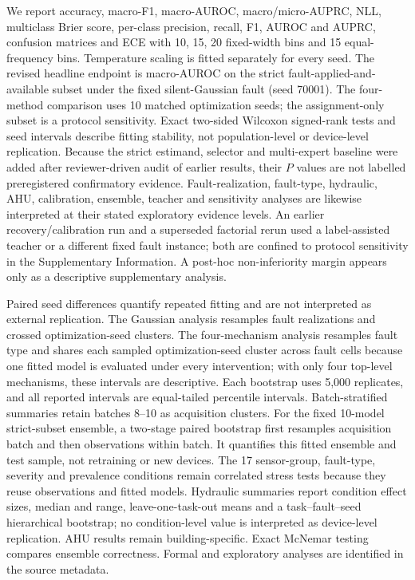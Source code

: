 \documentclass[11pt]{article}
\begin{document}
We report accuracy, macro-F1, macro-AUROC, macro/micro-AUPRC, NLL, multiclass Brier score, per-class precision, recall, F1, AUROC and AUPRC, confusion matrices and ECE with 10, 15, 20 fixed-width bins and 15 equal-frequency bins. Temperature scaling is fitted separately for every seed. The revised headline endpoint is macro-AUROC on the strict fault-applied-and-available subset under the fixed silent-Gaussian fault (seed 70001). The four-method comparison uses 10 matched optimization seeds; the assignment-only subset is a protocol sensitivity. Exact two-sided Wilcoxon signed-rank tests and seed intervals describe fitting stability, not population-level or device-level replication. Because the strict estimand, selector and multi-expert baseline were added after reviewer-driven audit of earlier results, their $P$ values are not labelled preregistered confirmatory evidence. Fault-realization, fault-type, hydraulic, AHU, calibration, ensemble, teacher and sensitivity analyses are likewise interpreted at their stated exploratory evidence levels. An earlier recovery/calibration run and a superseded factorial rerun used a label-assisted teacher or a different fixed fault instance; both are confined to protocol sensitivity in the Supplementary Information. A post-hoc non-inferiority margin appears only as a descriptive supplementary analysis.

Paired seed differences quantify repeated fitting and are not interpreted as external replication. The Gaussian analysis resamples fault realizations and crossed optimization-seed clusters. The four-mechanism analysis resamples fault type and shares each sampled optimization-seed cluster across fault cells because one fitted model is evaluated under every intervention; with only four top-level mechanisms, these intervals are descriptive. Each bootstrap uses 5,000 replicates, and all reported intervals are equal-tailed percentile intervals. Batch-stratified summaries retain batches 8--10 as acquisition clusters. For the fixed 10-model strict-subset ensemble, a two-stage paired bootstrap first resamples acquisition batch and then observations within batch. It quantifies this fitted ensemble and test sample, not retraining or new devices. The 17 sensor-group, fault-type, severity and prevalence conditions remain correlated stress tests because they reuse observations and fitted models. Hydraulic summaries report condition effect sizes, median and range, leave-one-task-out means and a task--fault--seed hierarchical bootstrap; no condition-level value is interpreted as device-level replication. AHU results remain building-specific. Exact McNemar testing compares ensemble correctness. Formal and exploratory analyses are identified in the source metadata.
\end{document}
